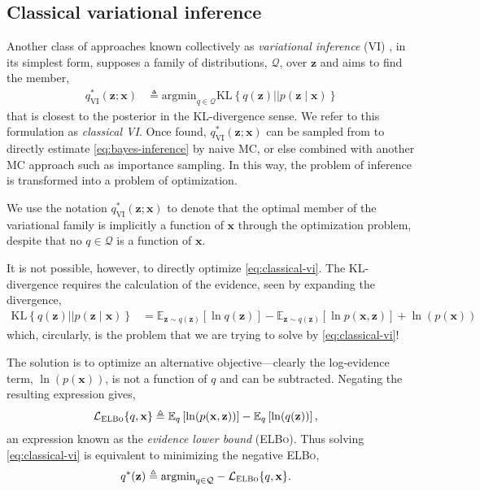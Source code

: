 \subsection{Classical variational inference}
Another class of approaches known collectively as \emph{variational inference} (VI) \citep{jordan1999introduction, BleiEtAl2016, zhang2018advances}, in its simplest form, supposes a family of distributions, $\mathcal{Q}$, over $\mathbf{z}$ and aims to find the member,
\begin{align}\label{eq:classical-vi}
	q^*_{\text{VI}}(\mathbf{z};\mathbf{x}) &\triangleq\text{argmin}_{q\in\mathcal{Q}}\text{KL}\left\{q(\mathbf{z})||p(\mathbf{z}\mid\mathbf{x})\right\}
\end{align}
that is closest to the posterior in the KL-divergence sense. We refer to this formulation as \emph{classical VI}. Once found, $q_{\text{VI}}^*(\mathbf{z};\mathbf{x})$ can be sampled from to directly estimate \eqref{eq:bayes-inference} by naive MC, or else combined with another MC approach such as importance sampling. In this way, the problem of inference is transformed into a problem of optimization.

We use the notation $q^*_{\text{VI}}(\mathbf{z};\mathbf{x})$ to denote that the optimal member of the variational family is implicitly a function of $\mathbf{x}$ through the optimization problem, despite that no $q\in\mathcal{Q}$ is a function of $\mathbf{x}$.

It is not possible, however, to directly optimize \eqref{eq:classical-vi}. The KL-divergence requires the calculation of the evidence, seen by expanding the divergence,
\begin{align*}
	\text{KL}\left\{q(\mathbf{z})||p(\mathbf{z}\mid\mathbf{x})\right\} &= \mathbb{E}_{\mathbf{z}\sim q(\mathbf{z})}\left[\ln q(\mathbf{z})\right] - \mathbb{E}_{\mathbf{z}\sim q(\mathbf{z})}\left[\ln p(\mathbf{x},\mathbf{z})\right] + \ln(p(\mathbf{x}))
\end{align*}
which, circularly, is the problem that we are trying to solve by \eqref{eq:classical-vi}!

The solution is to optimize an alternative objective---clearly the log-evidence term, $\ln(p(\mathbf{x}))$, is not a function of $q$ and can be subtracted. Negating the resulting expression gives,
\begin{align*}
	\mathcal{L}_{\text{\scshape ELBo}}\{q,\mathbf{x}\} &\triangleq \mathbb{E}_{q}\left[\ln(p(\mathbf{x},\mathbf{z}))\right] - \mathbb{E}_q\left[\ln(q(\mathbf{z}))\right],
\end{align*}
an expression known as the \emph{evidence lower bound} ({\scshape ELBo}). Thus solving \eqref{eq:classical-vi} is equivalent to minimizing the negative {\scshape ELBo},
\begin{align}\label{eq:neg-elbo}
	q^*(\mathbf{z}) &\triangleq\text{argmin}_{q\in\mathcal{Q}}-\mathcal{L}_{\text{\scshape ELBo}}\{q,\mathbf{x}\}.
\end{align}


